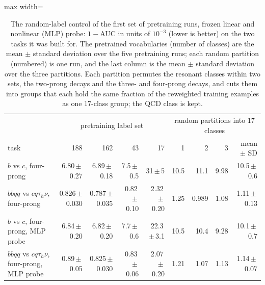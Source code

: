 \begin{table}[t]
\centering
\small
\setlength{\tabcolsep}{4pt}
\caption{The random-label control of the first set of pretraining runs, frozen linear and nonlinear (MLP) probe: $1-$AUC in units of $10^{-3}$ (lower is better) on the two tasks it was built for. The pretrained vocabularies (number of classes) are the mean $\pm$ standard deviation over the five pretraining runs; each random partition (numbered) is one run, and the last column is the mean $\pm$ standard deviation over the three partitions. Each partition permutes the resonant classes within two sets, the two-prong decays and the three- and four-prong decays, and cuts them into groups that each hold the same fraction of the reweighted training examples as one 17-class group; the QCD class is kept.}
\label{tab:random-control}
\begin{adjustbox}{max width=\linewidth}
\begin{tabular}{l rrrrrrrr}
\toprule
& \multicolumn{4}{c}{pretraining label set} & \multicolumn{4}{c}{random partitions into 17 classes} \\
task & 188 & 162 & 43 & 17 & 1 & 2 & 3 & mean $\pm$ SD \\
\midrule
$b$ vs $c$, four-prong & 6.80\,$\pm$\,0.27 & 6.89\,$\pm$\,0.18 & 7.5\,$\pm$\,0.5 & 31\,$\pm$\,5 & 10.5 & 11.1 & 9.98 & 10.5\,$\pm$\,0.6 \\
$bbqq$ vs $cq\tau_h\nu$, four-prong & 0.826\,$\pm$\,0.030 & 0.787\,$\pm$\,0.035 & 0.82\,$\pm$\,0.10 & 2.32\,$\pm$\,0.20 & 1.25 & 0.989 & 1.08 & 1.11\,$\pm$\,0.13 \\
$b$ vs $c$, four-prong, MLP probe & 6.84\,$\pm$\,0.20 & 6.82\,$\pm$\,0.20 & 7.7\,$\pm$\,0.6 & 22.3\,$\pm$\,3.1 & 10.5 & 10.4 & 9.28 & 10.1\,$\pm$\,0.7 \\
$bbqq$ vs $cq\tau_h\nu$, four-prong, MLP probe & 0.89\,$\pm$\,0.05 & 0.825\,$\pm$\,0.030 & 0.83\,$\pm$\,0.06 & 2.07\,$\pm$\,0.20 & 1.21 & 1.07 & 1.13 & 1.14\,$\pm$\,0.07 \\
\bottomrule
\end{tabular}
\end{adjustbox}
\end{table}
